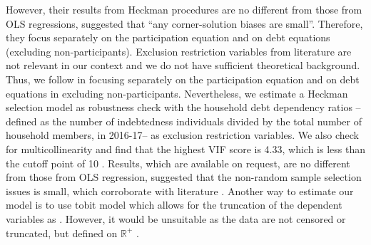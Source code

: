 \documentclass[a4paper, 12pt, onecolumn]{article}
\newcommand{\PTCS}{PT\&CS}
\begin{document}
However, their results from Heckman procedures are no different from those from OLS regressions, suggested that ``any corner-solution biases are small''.
Therefore, they focus separately on the participation equation and on debt equations (excluding non-participants).
Exclusion restriction variables from literature are not relevant in our context and we do not have sufficient theoretical background.
Thus, we follow \cite{Rio2006} in focusing separately on the participation equation and on debt equations in excluding non-participants.
Nevertheless, we estimate a Heckman selection model as robustness check with the household debt dependency ratios --defined as the number of indebtedness individuals divided by the total number of household members, in 2016-17-- as exclusion restriction variables.
We also check for multicollinearity and find that the highest VIF score is 4.33, which is less than the cutoff point of 10 \citep{Lennox2011}.
Results, which are available on request, are no different from those from OLS regression, suggested that the non-random sample selection issues is small, which corroborate with literature \citep{Rio2006, Brown2014}.
Another way to estimate our model is to use tobit model which allows for the truncation of the dependent variables as \cite{Brown2014, Cox1993}.
However, it would be unsuitable as the data are not censored or truncated, but defined on $\mathbb{R}^{+}$ \citep{Maddala1991}.


\end{document}
